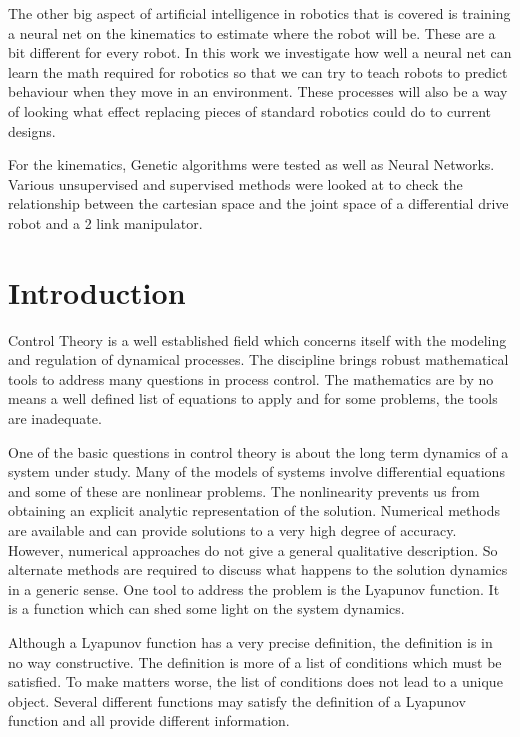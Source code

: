\documentclass[12pt]{article}
\begin{document}
The other big aspect of artificial intelligence in robotics that is covered is training a neural net on the kinematics to estimate where the robot will be. These are a bit different for every robot. In this work we investigate how well a neural net can learn the math required for robotics so that we can try to teach robots to predict behaviour when they move in an environment. These processes will also be a way of looking what effect replacing pieces of standard robotics could do to current designs.

For the kinematics, Genetic algorithms were tested as well as Neural Networks. Various unsupervised and supervised methods were looked at to check the relationship between the cartesian space and the joint space of a differential drive robot and a 2 link manipulator. 



\newpage
\setcounter{page}{1} 

\section{Introduction}

Control Theory is a well established field which concerns itself
with the modeling and regulation of dynamical processes.  The discipline
brings robust mathematical tools to address many questions in process
control.  The mathematics are by no means a well defined list of
equations to apply and for some problems, the tools are inadequate.

One of the basic questions in control theory is about the long term
dynamics of a system under study.  Many of the models of systems
involve differential equations and some of these are nonlinear
problems.  The nonlinearity prevents us from obtaining an explicit
analytic representation of the solution. Numerical methods are
available and can provide solutions to a very high degree of accuracy.
However, numerical approaches do not give a general qualitative
description.  So alternate methods are required to discuss what
happens to the solution dynamics in a generic sense.  One tool to
address the problem is the Lyapunov function.  It is a function which
can shed some light on the system dynamics.

Although a Lyapunov function has a very precise definition, the
definition is in no way constructive.   The definition is more of a
list of conditions which must be satisfied.  To make matters worse,
the list of conditions does not lead to a unique object.  Several
different functions may satisfy the definition of a Lyapunov function
and all provide  different information.
\end{document}
